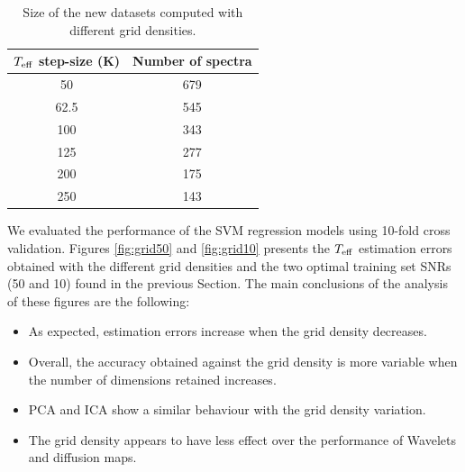 \documentclass[a4paper,fleqn,usenatbib]{mnras}
\begin{document}
{{{\begin{table}
\centering
\caption{Size of the new datasets computed with different grid densities.}
\label{tab:grid}
\begin{tabular}{c c}
\hline
\textbf{$T_{\rm eff}$ step-size (K)} & \textbf{Number of spectra} \\
\hline
50 & 679 \\
62.5 & 545 \\
100 & 343 \\
125 & 277 \\
200 & 175\\
250 & 143\\
\hline
\end{tabular}
\end{table}

We evaluated the performance of the SVM regression models using
10-fold cross validation. Figures \ref{fig:grid50} and
\ref{fig:grid10} presents the $T_{\rm eff}$ estimation errors obtained
with the different grid densities and the two optimal training set
SNRs (50 and 10) found in the previous Section. The main conclusions
of the analysis of these figures are the following:

\begin{itemize}
\item As expected, estimation errors increase when the grid 
	density decreases.
\item Overall, the accuracy obtained against the grid density 
	is more variable when the number of dimensions retained 
	increases. 
\item PCA and ICA show a similar behaviour with the grid density
  variation.
\item The grid density appears to have less effect over the
  performance of Wavelets and diffusion maps.
\end{itemize}

}}}
\end{document}
